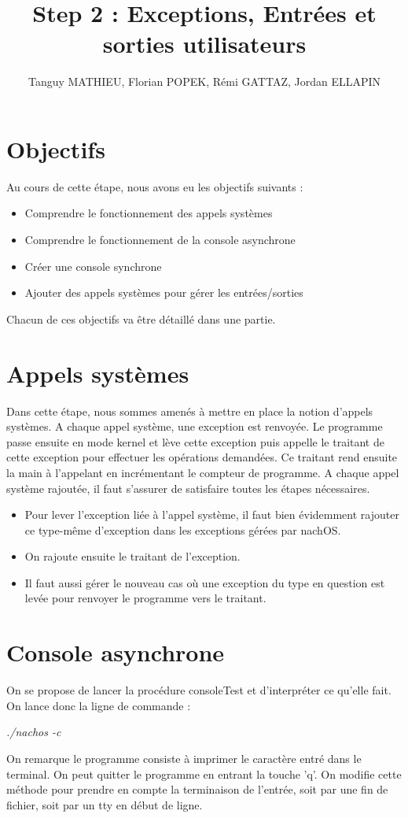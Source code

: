 \documentclass[a4paper,10pt]{article}
\title{Step 2 : Exceptions, Entrées et sorties utilisateurs}
\author{Tanguy MATHIEU, Florian POPEK, Rémi GATTAZ, Jordan ELLAPIN}
\begin{document}
\maketitle
\tableofcontents

\newpage
\section{Objectifs}
    Au cours de cette étape, nous avons eu les objectifs suivants :
    \begin{itemize}
        \item Comprendre le fonctionnement des appels systèmes
        \item Comprendre le fonctionnement de la console asynchrone
        \item Créer une console synchrone
        \item Ajouter des appels systèmes pour gérer les entrées/sorties
    \end{itemize}

    Chacun de ces objectifs va être détaillé dans une partie.

\section{Appels systèmes}
    Dans cette étape, nous sommes amenés à mettre en place la notion d'appels systèmes. A chaque appel système, une exception est renvoyée. Le programme passe ensuite en mode kernel et lève cette exception puis appelle le traitant de cette exception pour effectuer les opérations demandées. Ce traitant rend ensuite la main à l'appelant en incrémentant le compteur de programme. A chaque appel système rajoutée, il faut s'assurer de satisfaire toutes les étapes nécessaires.

    \begin{itemize}
        \item Pour lever l'exception liée à l'appel système, il faut bien évidemment rajouter ce type-même d'exception dans les exceptions gérées par nachOS.
        \item On rajoute ensuite le traitant de l'exception.
        \item Il faut aussi gérer le nouveau cas où une exception du type en question est levée pour renvoyer le programme vers le traitant.
    \end{itemize}

\section{Console asynchrone}
    On se propose de lancer la procédure consoleTest et d'interpréter ce qu'elle fait. On lance donc la ligne de commande :
    \begin{center}
        \emph{./nachos -c }
    \end{center}
    On remarque le programme consiste à imprimer le caractère entré dans le terminal. On peut quitter le programme en entrant la touche 'q'.
    On modifie cette méthode pour prendre en compte la terminaison de l'entrée, soit par une fin de fichier, soit par un tty en début de ligne.
\end{document}
